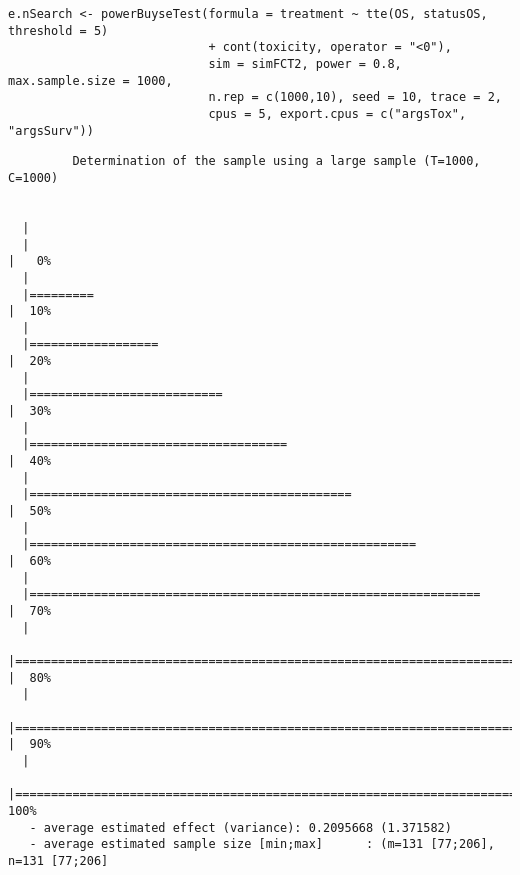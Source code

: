 \documentclass[12pt]{article}
\begin{document}
\lstset{language=r,label= ,caption= ,captionpos=b,numbers=none}
\begin{lstlisting}
e.nSearch <- powerBuyseTest(formula = treatment ~ tte(OS, statusOS, threshold = 5)
                            + cont(toxicity, operator = "<0"),
                            sim = simFCT2, power = 0.8, max.sample.size = 1000,
                            n.rep = c(1000,10), seed = 10, trace = 2, 
                            cpus = 5, export.cpus = c("argsTox", "argsSurv"))
\end{lstlisting}

\begin{verbatim}
         Determination of the sample using a large sample (T=1000, C=1000)  


  |                                                                                                
  |                                                                                          |   0%
  |                                                                                                
  |=========                                                                                 |  10%
  |                                                                                                
  |==================                                                                        |  20%
  |                                                                                                
  |===========================                                                               |  30%
  |                                                                                                
  |====================================                                                      |  40%
  |                                                                                                
  |=============================================                                             |  50%
  |                                                                                                
  |======================================================                                    |  60%
  |                                                                                                
  |===============================================================                           |  70%
  |                                                                                                
  |========================================================================                  |  80%
  |                                                                                                
  |=================================================================================         |  90%
  |                                                                                                
  |==========================================================================================| 100%
   - average estimated effect (variance): 0.2095668 (1.371582)
   - average estimated sample size [min;max]      : (m=131 [77;206], n=131 [77;206]


\end{verbatim}
\end{document}
